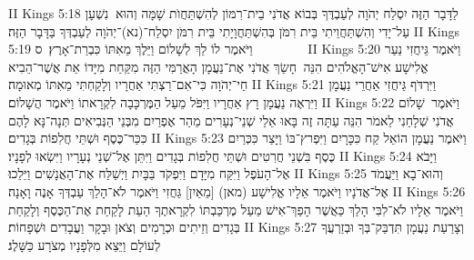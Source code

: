 II Kings 5:18	לַדָּבָר הַזֶּה יִסְלַח יְהֹוָה לְעַבְדֶּךָ בְּבוֹא אֲדֹנִי בֵית־רִמּוֹן לְהִשְׁתַּחֲוֺת שָׁמָּה וְהוּא  נִשְׁעָן עַל־יָדִי וְהִשְׁתַּחֲוֵיתִי בֵּית רִמֹּן בְּהִשְׁתַּחֲוָיָתִי בֵּית רִמֹּן יִסְלַח־(נא)־יְהֹוָה לְעַבְדְּךָ בַּדָּבָר הַזֶּה׃
II Kings 5:19	וַיֹּאמֶר לוֹ לֵךְ לְשָׁלוֹם וַיֵּלֶךְ מֵאִתּוֹ כִּבְרַת־אָרֶץ׃ {ס}        
II Kings 5:20	וַיֹּאמֶר גֵּיחֲזִי נַעַר אֱלִישָׁע אִישׁ־הָאֱלֹהִים הִנֵּה  חָשַׂךְ אֲדֹנִי אֶת־נַעֲמָן הָאֲרַמִּי הַזֶּה מִקַּחַת מִיָּדוֹ אֵת אֲשֶׁר־הֵבִיא חַי־יְהֹוָה כִּי־אִם־רַצְתִּי אַחֲרָיו וְלָקַחְתִּי מֵאִתּוֹ מְאוּמָה׃
II Kings 5:21	וַיִּרְדֹּף גֵּיחֲזִי אַחֲרֵי נַעֲמָן וַיִּרְאֶה נַעֲמָן רָץ אַחֲרָיו וַיִּפֹּל מֵעַל הַמֶּרְכָּבָה לִקְרָאתוֹ וַיֹּאמֶר הֲשָׁלוֹם׃
II Kings 5:22	וַיֹּאמֶר  שָׁלוֹם אֲדֹנִי שְׁלָחַנִי לֵאמֹר הִנֵּה עַתָּה זֶה בָּאוּ אֵלַי שְׁנֵי־נְעָרִים מֵהַר אֶפְרַיִם מִבְּנֵי הַנְּבִיאִים תְּנָה־נָּא לָהֶם כִּכַּר־כֶּסֶף וּשְׁתֵּי חֲלִפוֹת בְּגָדִים׃
II Kings 5:23	וַיֹּאמֶר נַעֲמָן הוֹאֵל קַח כִּכָּרָיִם וַיִּפְרץ־בּוֹ וַיָּצַר כִּכְּרַיִם כֶּסֶף בִּשְׁנֵי חֲרִטִים וּשְׁתֵּי חֲלִפוֹת בְּגָדִים וַיִּתֵּן אֶל־שְׁנֵי נְעָרָיו וַיִּשְׂאוּ לְפָנָיו׃
II Kings 5:24	וַיָּבֹא אֶל־הָעֹפֶל וַיִּקַּח מִיָּדָם וַיִּפְקֹד בַּבָּיִת וַיְשַׁלַּח אֶת־הָאֲנָשִׁים וַיֵּלֵכוּ׃
II Kings 5:25	וְהוּא־בָא וַיַּעֲמֹד אֶל־אֲדֹנָיו וַיֹּאמֶר אֵלָיו אֱלִישָׁע (מאן) [מֵאַיִן] גֵּחֲזִי וַיֹּאמֶר לֹא־הָלַךְ עַבְדְּךָ אָנֶה וָאָנָה׃
II Kings 5:26	וַיֹּאמֶר אֵלָיו לֹא־לִבִּי הָלַךְ כַּאֲשֶׁר הָפַךְ־אִישׁ מֵעַל מֶרְכַּבְתּוֹ לִקְרָאתֶךָ הַעֵת לָקַחַת אֶת־הַכֶּסֶף וְלָקַחַת בְּגָדִים וְזֵיתִים וּכְרָמִים וְצֹאן וּבָקָר וַעֲבָדִים וּשְׁפָחוֹת׃
II Kings 5:27	וְצָרַעַת נַעֲמָן תִּדְבַּק־בְּךָ וּבְזַרְעֲךָ לְעוֹלָם וַיֵּצֵא מִלְּפָנָיו מְצֹרָע כַּשָּׁלֶג׃
